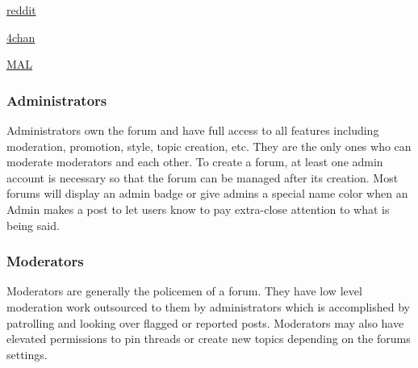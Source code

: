 \documentclass[]{article}
\begin{document}
\vspace{0.2 cm}
\begin{minipage}{0.4\textwidth}
\hspace{0.3cm}
\href{https://www.reddit.com/}{reddit}
\vspace{0.2 cm}
\end{minipage}%
\vline
\begin{minipage}{0.23\textwidth}
\hspace{0.3cm}
\href{https://www.4channel.org/}{4chan}
\vspace{0.2 cm}
\end{minipage}%
\vline
\begin{minipage}{0.4\textwidth}
\hspace{0.3cm}
\href{https://myanimelist.net/}{MAL}
\vspace{0.2 cm}
\end{minipage}%

\subsubsection{Administrators}
Administrators own the forum and have full access to all features including moderation, promotion, style, topic creation, etc. They are the only ones who can moderate moderators and each other. To create a forum, at least one admin account is necessary so that the forum can be managed after its creation. Most forums will display an admin badge or give admins a special name color when an Admin makes a post to let users know to pay extra-close attention to what is being said.    

\subsubsection{Moderators}
Moderators are generally the policemen of a forum. They have low level moderation work outsourced to them by administrators which is accomplished by patrolling and looking over flagged or reported posts. Moderators may also have elevated permissions to pin threads or create new topics depending on the forums settings.
\end{document}
